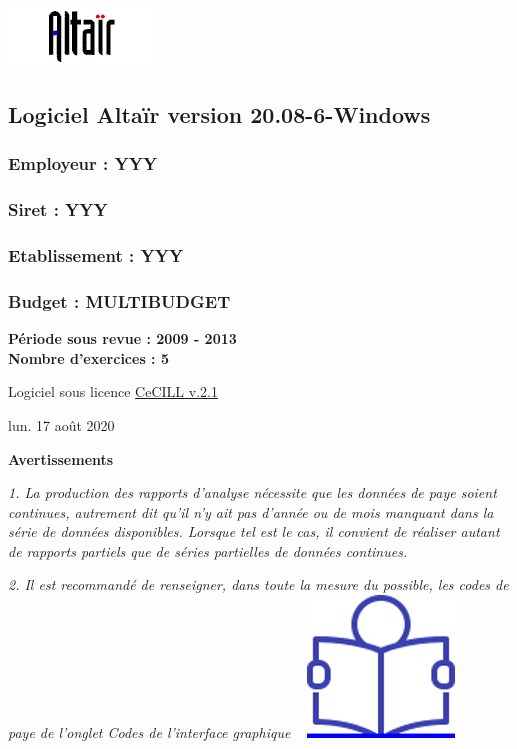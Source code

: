 \includegraphics{icones/altair.png}

\hypertarget{logiciel-altair-version-20.08-6-windows}{%
\subsection{Logiciel Altaïr version
20.08-6-Windows}\label{logiciel-altair-version-20.08-6-windows}}

\hypertarget{employeur-yyy}{%
\subsubsection{Employeur : YYY}\label{employeur-yyy}}

\hypertarget{siret-yyy}{%
\subsubsection{Siret : YYY}\label{siret-yyy}}

\hypertarget{etablissement-yyy}{%
\subsubsection{Etablissement : YYY}\label{etablissement-yyy}}

\hypertarget{budget-multibudget}{%
\subsubsection{Budget : MULTIBUDGET}\label{budget-multibudget}}

\textbf{Période sous revue : 2009 - 2013 }\\
\textbf{Nombre d'exercices : 5 }

Logiciel sous licence \href{../Docs/LICENCE.html}{CeCILL v.2.1}

lun. 17 août 2020

\textbf{Avertissements}

\emph{1. La production des rapports d'analyse nécessite que les données
de paye soient continues, autrement dit qu'il n'y ait pas d'année ou de
mois manquant dans la série de données disponibles. Lorsque tel est le
cas, il convient de réaliser autant de rapports partiels que de séries
partielles de données continues.}

\emph{2. Il est recommandé de renseigner, dans toute la mesure du
possible, les codes de paye de l'onglet Codes de l'interface graphique}
~
\href{../Docs/Notices/fiche_onglet_codes.odt}{\includegraphics{icones/Notice.png}}

